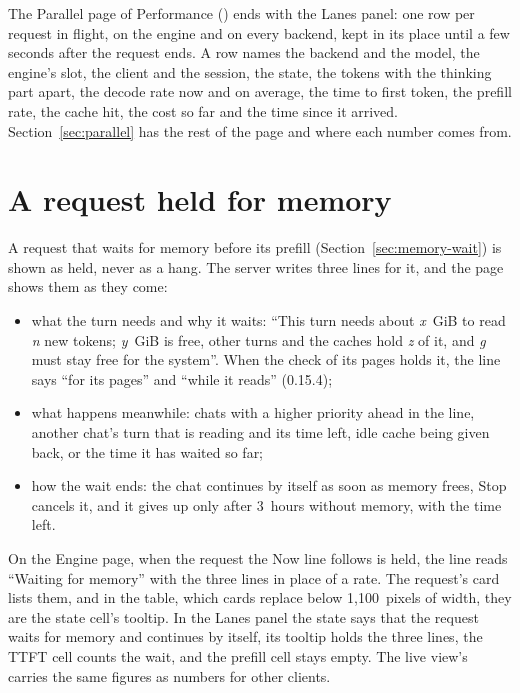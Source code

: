 The Parallel page of Performance () ends with the Lanes panel: one row per request in flight, on the engine and on every backend, kept in its place until a few seconds after the request ends. A row names the backend and the model, the engine's slot, the client and the session, the state, the tokens with the thinking part apart, the decode rate now and on average, the time to first token, the prefill rate, the cache hit, the cost so far and the time since it arrived. Section~\ref{sec:parallel} has the rest of the page and where each number comes from.

\section{A request held for memory}\label{sec:dash-held}

A request that waits for memory before its prefill (Section~\ref{sec:memory-wait}) is shown as held, never as a hang. The server writes three lines for it, and the page shows them as they come:

\begin{itemize}
\item what the turn needs and why it waits: \enquote{This turn needs about \textit{x}~GiB to read \textit{n} new tokens; \textit{y}~GiB is free, other turns and the caches hold \textit{z} of it, and \textit{g} must stay free for the system}. When the check of its pages holds it, the line says \enquote{for its pages} and \enquote{while it reads} (0.15.4);
\item what happens meanwhile: chats with a higher priority ahead in the line, another chat's turn that is reading and its time left, idle cache being given back, or the time it has waited so far;
\item how the wait ends: the chat continues by itself as soon as memory frees, Stop cancels it, and it gives up only after 3~hours without memory, with the time left.
\end{itemize}

On the Engine page, when the request the Now line follows is held, the line reads \enquote{Waiting for memory} with the three lines in place of a rate. The request's card lists them, and in the table, which cards replace below 1,100~pixels of width, they are the state cell's tooltip. In the Lanes panel the state says that the request waits for memory and continues by itself, its tooltip holds the three lines, the TTFT cell counts the wait, and the prefill cell stays empty. The live view's  carries the same figures as numbers for other clients.

